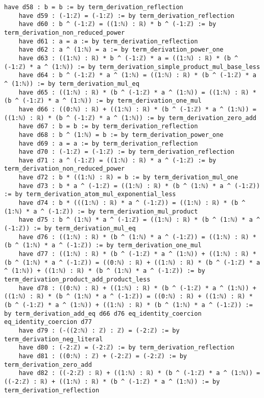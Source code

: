\documentclass{article}
\begin{document}
\begin{tcolorbox}[colback=white!10, width=\linewidth]
\begin{lstlisting}[language=Lean4]
    have d58 : b = b := by term_derivation_reflection
    have d59 : (-1:ℤ) = (-1:ℤ) := by term_derivation_reflection
    have d60 : b ^ (-1:ℤ) = ((1:ℕ) : ℝ) * b ^ (-1:ℤ) := by term_derivation_non_reduced_power
    have d61 : a = a := by term_derivation_reflection
    have d62 : a ^ (1:ℕ) = a := by term_derivation_power_one
    have d63 : ((1:ℕ) : ℝ) * b ^ (-1:ℤ) * a = ((1:ℕ) : ℝ) * (b ^ (-1:ℤ) * a ^ (1:ℕ)) := by term_derivation_simple_product_mul_base_less
    have d64 : b ^ (-1:ℤ) * a ^ (1:ℕ) = ((1:ℕ) : ℝ) * (b ^ (-1:ℤ) * a ^ (1:ℕ)) := by term_derivation_mul_eq
    have d65 : ((1:ℕ) : ℝ) * (b ^ (-1:ℤ) * a ^ (1:ℕ)) = ((1:ℕ) : ℝ) * (b ^ (-1:ℤ) * a ^ (1:ℕ)) := by term_derivation_one_mul
    have d66 : ((0:ℕ) : ℝ) + ((1:ℕ) : ℝ) * (b ^ (-1:ℤ) * a ^ (1:ℕ)) = ((1:ℕ) : ℝ) * (b ^ (-1:ℤ) * a ^ (1:ℕ)) := by term_derivation_zero_add
    have d67 : b = b := by term_derivation_reflection
    have d68 : b ^ (1:ℕ) = b := by term_derivation_power_one
    have d69 : a = a := by term_derivation_reflection
    have d70 : (-1:ℤ) = (-1:ℤ) := by term_derivation_reflection
    have d71 : a ^ (-1:ℤ) = ((1:ℕ) : ℝ) * a ^ (-1:ℤ) := by term_derivation_non_reduced_power
    have d72 : b * ((1:ℕ) : ℝ) = b := by term_derivation_mul_one
    have d73 : b * a ^ (-1:ℤ) = ((1:ℕ) : ℝ) * (b ^ (1:ℕ) * a ^ (-1:ℤ)) := by term_derivation_atom_mul_exponential_less
    have d74 : b * (((1:ℕ) : ℝ) * a ^ (-1:ℤ)) = ((1:ℕ) : ℝ) * (b ^ (1:ℕ) * a ^ (-1:ℤ)) := by term_derivation_mul_product
    have d75 : b ^ (1:ℕ) * a ^ (-1:ℤ) = ((1:ℕ) : ℝ) * (b ^ (1:ℕ) * a ^ (-1:ℤ)) := by term_derivation_mul_eq
    have d76 : ((1:ℕ) : ℝ) * (b ^ (1:ℕ) * a ^ (-1:ℤ)) = ((1:ℕ) : ℝ) * (b ^ (1:ℕ) * a ^ (-1:ℤ)) := by term_derivation_one_mul
    have d77 : ((1:ℕ) : ℝ) * (b ^ (-1:ℤ) * a ^ (1:ℕ)) + ((1:ℕ) : ℝ) * (b ^ (1:ℕ) * a ^ (-1:ℤ)) = ((0:ℕ) : ℝ) + ((1:ℕ) : ℝ) * (b ^ (-1:ℤ) * a ^ (1:ℕ)) + ((1:ℕ) : ℝ) * (b ^ (1:ℕ) * a ^ (-1:ℤ)) := by term_derivation_product_add_product_less
    have d78 : ((0:ℕ) : ℝ) + ((1:ℕ) : ℝ) * (b ^ (-1:ℤ) * a ^ (1:ℕ)) + ((1:ℕ) : ℝ) * (b ^ (1:ℕ) * a ^ (-1:ℤ)) = ((0:ℕ) : ℝ) + ((1:ℕ) : ℝ) * (b ^ (-1:ℤ) * a ^ (1:ℕ)) + ((1:ℕ) : ℝ) * (b ^ (1:ℕ) * a ^ (-1:ℤ)) := by term_derivation_add_eq d66 d76 eq_identity_coercion eq_identity_coercion d77
    have d79 : (-((2:ℕ) : ℤ) : ℤ) = (-2:ℤ) := by term_derivation_neg_literal
    have d80 : (-2:ℤ) = (-2:ℤ) := by term_derivation_reflection
    have d81 : ((0:ℕ) : ℤ) + (-2:ℤ) = (-2:ℤ) := by term_derivation_zero_add
    have d82 : ((-2:ℤ) : ℝ) + ((1:ℕ) : ℝ) * (b ^ (-1:ℤ) * a ^ (1:ℕ)) = ((-2:ℤ) : ℝ) + ((1:ℕ) : ℝ) * (b ^ (-1:ℤ) * a ^ (1:ℕ)) := by term_derivation_reflection

\end{lstlisting}
\end{tcolorbox}
\end{document}

